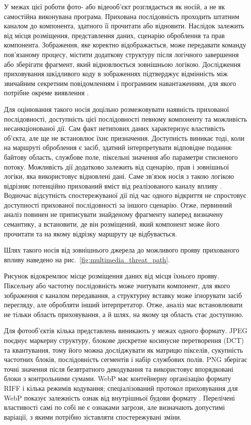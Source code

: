 У межах цієї роботи фото- або відеооб’єкт розглядається як носій, а не як самостійна виконувана програма. Прихована послідовність проходить штатним каналом до компонента, здатного її прочитати або відновити. Наслідок залежить від місця розміщення, представлення даних, сценарію оброблення та прав компонента. Зображення, яке коректно відображається, може передавати команду пов’язаному процесу, містити додаткову структуру після логічного завершення або зберігати фрагмент, який відновлюється зовнішньою логікою. Дослідження приховування шкідливого коду в зображеннях підтверджує відмінність між звичайним секретним повідомленням і програмним навантаженням, для якого потрібне окреме виявлення \cite{kumagai2022malwareimage}.

Для оцінювання такого носія доцільно розмежовувати наявність прихованої послідовності, доступність цієї послідовності певному компоненту та можливість несанкціонованої дії. Сам факт нетипових даних характеризує властивість об’єкта, але ще не встановлює їхнє призначення. Доступність виникає тоді, коли на маршруті оброблення є засіб, здатний інтерпретувати відповідне подання: байтову область, службове поле, піксельні значення або параметри стисненого потоку. Можливість дії додатково залежить від сценарію, прав і зовнішньої логіки, яка використовує відновлені дані. Саме зв’язок носія з такою логікою відрізняє потенційно прихований вміст від реалізованого каналу впливу \cite{iglesias2023driveby}. Водночас відсутність спостережуваної дії під час одного відкриття не спростовує доступності прихованої послідовності за іншого сценарію. Отже, первинний аналіз повинен не приписувати знайденому фрагменту наперед визначену семантику, а встановити, де він розміщений, який компонент може його прочитати та на якому відрізку маршруту це відбувається.

Шлях такого носія від зовнішнього джерела до можливого прояву прихованого впливу наведено на рис.~\ref{fig:multimedia_threat_path}.



Рисунок відокремлює місце розміщення даних від місця їхнього прояву. Піксельну або частотну послідовність може зчитувати компонент, для якого зображення є каналом передавання, а структурну вставку може ігнорувати засіб перегляду, але обробляти інший інтерпретатор. Отже, аналіз має встановлювати не тільки область приховування, а й шлях, на якому ця область стає доступною.

Для фотооб’єктів кілька представлень виникають у межах одного формату. JPEG поєднує маркерну структуру, блокове дискретне косинусне перетворення (DCT) та квантування, тому його можна досліджувати як матрицю пікселів, сукупність частотних блоків, послідовність сегментів і набір службових полів. PNG зберігає точні значення після безвтратного декодування та використовує впорядковані блоки з контрольними сумами. WebP має контейнерну організацію формату RIFF і кілька режимів кодування; спеціалізований протокол приховування для WebP показує залежність ознак від внутрішньої будови формату \cite{koptyra2023webp}. Перелічені властивості самі по собі не є ознаками загрози, але визначають допустимі варіації, з якими потрібно зіставляти спостережувані зміни.

